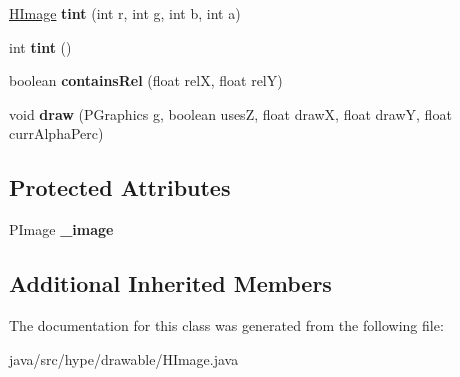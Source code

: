 \begin{DoxyCompactItemize}
\item 
\hypertarget{classhype_1_1drawable_1_1_h_image_a5a3f54f38e840c9ea82f00e7e4dd6467}{\hyperlink{classhype_1_1drawable_1_1_h_image}{H\-Image} {\bfseries tint} (int r, int g, int b, int a)}\label{classhype_1_1drawable_1_1_h_image_a5a3f54f38e840c9ea82f00e7e4dd6467}

\item 
\hypertarget{classhype_1_1drawable_1_1_h_image_adf558fb9f12c04e7de5b345f8d7a00c7}{int {\bfseries tint} ()}\label{classhype_1_1drawable_1_1_h_image_adf558fb9f12c04e7de5b345f8d7a00c7}

\item 
\hypertarget{classhype_1_1drawable_1_1_h_image_a115ff4218c705ab812aa91c0a5c0ba40}{boolean {\bfseries contains\-Rel} (float rel\-X, float rel\-Y)}\label{classhype_1_1drawable_1_1_h_image_a115ff4218c705ab812aa91c0a5c0ba40}

\item 
\hypertarget{classhype_1_1drawable_1_1_h_image_a146ed5da0e04dac7cb7f2e42f18ba47c}{void {\bfseries draw} (P\-Graphics g, boolean uses\-Z, float draw\-X, float draw\-Y, float curr\-Alpha\-Perc)}\label{classhype_1_1drawable_1_1_h_image_a146ed5da0e04dac7cb7f2e42f18ba47c}

\end{DoxyCompactItemize}
\subsection*{Protected Attributes}
\begin{DoxyCompactItemize}
\item 
\hypertarget{classhype_1_1drawable_1_1_h_image_a26ed394b0920e18b39ed31e750dcc002}{P\-Image {\bfseries \-\_\-image}}\label{classhype_1_1drawable_1_1_h_image_a26ed394b0920e18b39ed31e750dcc002}

\end{DoxyCompactItemize}
\subsection*{Additional Inherited Members}


The documentation for this class was generated from the following file\-:\begin{DoxyCompactItemize}
\item 
java/src/hype/drawable/H\-Image.\-java\end{DoxyCompactItemize}
